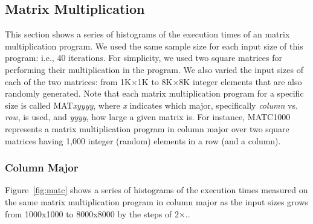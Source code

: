 \documentclass[10pt]{article}
\begin{document}
\subsection{Matrix Multiplication~\label{sec:mm}} 

This section shows a series of histograms of 
the execution times of an matrix multiplication program. 
We used the same sample size for each input size of this program: i.e., 40 iterations. 
For simplicity, we used two square matrices for performing their multiplication in the program.  
We also varied the input sizes of each of the two matrices: 
from 1K$\times$1K to 8K$\times$8K integer elements that are also randomly generated. 
Note that each matrix multiplication program for a specific size is called MAT{\it xyyyy}, 
where {\it x} indicates which major, specifically {\em column} vs. {\em row}, is used, and {\it yyyy}, how large a given matrix is. 
For instance, MATC1000 represents a matrix multiplication program 
in column major over two square matrices having 1,000 integer (random) 
elements in a row (and a column). 

\subsubsection{Column Major}

Figure~\ref{fig:matc} shows a series of 
histograms of the execution times measured on 
the same matrix multiplication program in column major 
as the input sizes grows from 1000x1000 to 8000x8000 by the steps of 2{\small $\times$}.. 

\pagebreak
\end{document}
